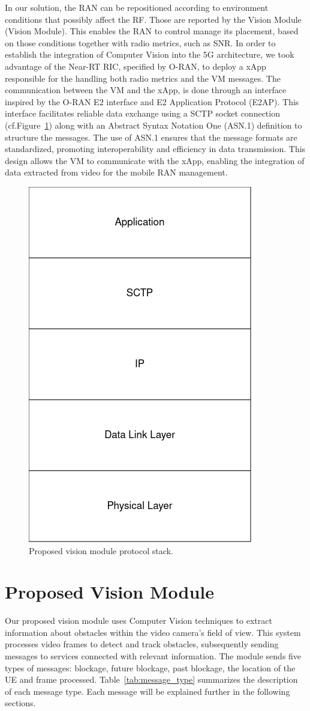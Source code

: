 In our solution, the RAN can be repositioned according to environment conditions that possibly affect the RF\@.
Those are reported by the Vision Module (Vision Module).
This enables the RAN to control manage its placement, based on those conditions together with radio metrics, such as SNR\@.
In order to establish the integration of Computer Vision into the 5G architecture, we took advantage of the Near-RT RIC, specified by O-RAN, to deploy a xApp responsible for the handling both radio metrics and the VM messages.
The communication between the VM and the xApp, is done through an interface inspired by the O-RAN E2 interface and E2 Application Protocol (E2AP).
This interface facilitates reliable data exchange using a SCTP socket connection (cf.Figure~\ref{fig:stack}) along with an Abstract Syntax Notation One (ASN.1) definition to structure the messages.
The use of ASN.1 ensures that the message formats are standardized, promoting interoperability and efficiency in data transmission.
This design allows the VM to communicate with the xApp, enabling the integration of data extracted from video for the mobile RAN management.

\begin{figure}[H]
    \centering
    \includegraphics[width=0.35\linewidth]{figures/VisionModule_ProtocolStack.drawio(2)}
    \caption[Proposed Vision Module Protocol Stack]{Proposed vision module protocol stack.}
    \label{fig:stack}
\end{figure}


\section{Proposed Vision Module}\label{sec:prop_vision}
Our proposed vision module uses Computer Vision techniques to extract information about obstacles within the video camera's field of view.
This system processes video frames to detect and track obstacles, subsequently sending messages to services connected with relevant information.
The module sends five types of messages: blockage, future blockage, past blockage, the location of the UE and frame processed.
Table~\ref{tab:message_type} summarizes the description of each message type.
Each message will be explained further in the following sections.

